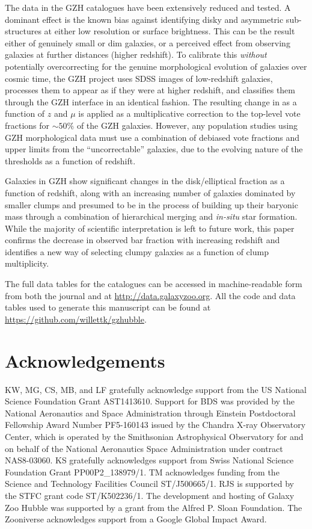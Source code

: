 \documentclass[a4paper,fleqn,usenatbib]{mnras}
\begin{document}
The data in the GZH catalogues have been extensively reduced and tested. A
dominant effect is the known bias against identifying disky and asymmetric
sub-structures at either low resolution or surface brightness. This can be the
result either of genuinely small or dim galaxies, or a perceived effect from
observing galaxies at further distances (higher redshift). To calibrate this
\emph{without} potentially overcorrecting for the genuine morphological
evolution of galaxies over cosmic time, the GZH project uses SDSS images of
low-redshift galaxies, processes them to appear as if they were at higher
redshift, and classifies them through the GZH interface in an identical
fashion. The resulting change in \ffeatures{} as a function of $z$ and $\mu$ is
applied as a multiplicative correction to the top-level vote fractions for
$\sim50\%$ of the GZH galaxies. However, any population studies using
GZH morphological data must use a combination of debiased vote fractions
and upper limits from the ``uncorrectable'' galaxies, due to the evolving nature
of the thresholds as a function of redshift.

Galaxies in GZH show significant changes in the disk/elliptical fraction as a
function of redshift, along with an increasing number of galaxies dominated by
smaller clumps and presumed to be in the process of building up their baryonic
mass through a combination of hierarchical merging and {\it in-situ} star formation.
While the majority of scientific interpretation is left to future work, this
paper confirms the decrease in observed bar fraction with increasing redshift
and identifies a new way of selecting clumpy galaxies as a
function of clump multiplicity.

The full data tables for the catalogues can be accessed in machine-readable form
from both the journal and at \url{http://data.galaxyzoo.org}. All the code and
data tables used to generate this manuscript can be found at
\url{https://github.com/willettk/gzhubble}.
 
\section*{Acknowledgements}
KW, MG, CS, MB, and LF gratefully acknowledge support from the US National
Science Foundation Grant AST1413610.
Support for BDS was provided by the National Aeronautics and Space
Administration through Einstein Postdoctoral Fellowship Award Number PF5-160143
issued by the Chandra X-ray Observatory Center, which is operated by the
Smithsonian Astrophysical Observatory for and on behalf of the National
Aeronautics Space Administration under contract NAS8-03060.
KS gratefully acknowledges support from
Swiss National Science Foundation Grant PP00P2\_138979/1. TM acknowledges
funding from the Science and Technology Facilities Council ST/J500665/1. 
RJS is supported by the STFC grant code ST/K502236/1.
The development and hosting of Galaxy Zoo Hubble was supported by a grant from
the Alfred P. Sloan Foundation. The Zooniverse acknowledges support from a
Google Global Impact Award. 
\end{document}

